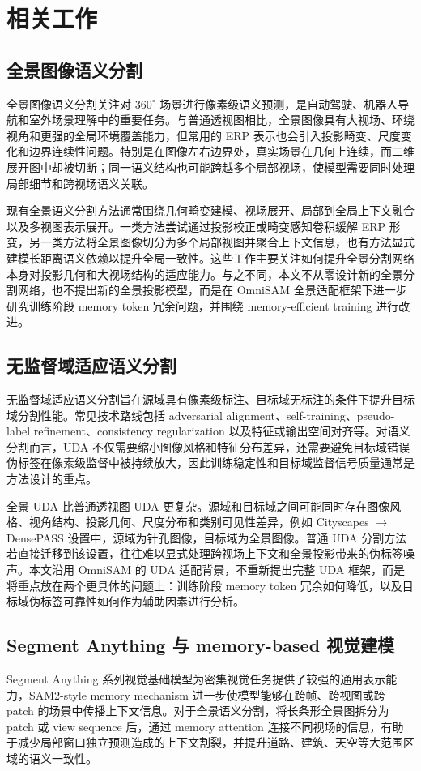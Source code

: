 \section{相关工作}
\label{sec:related_work}

\subsection{全景图像语义分割}
全景图像语义分割关注对 $360^\circ$ 场景进行像素级语义预测，是自动驾驶、机器人导航和室外场景理解中的重要任务。与普通透视图相比，全景图像具有大视场、环绕视角和更强的全局环境覆盖能力，但常用的 ERP 表示也会引入投影畸变、尺度变化和边界连续性问题。特别是在图像左右边界处，真实场景在几何上连续，而二维展开图中却被切断；同一语义结构也可能跨越多个局部视场，使模型需要同时处理局部细节和跨视场语义关联。

现有全景语义分割方法通常围绕几何畸变建模、视场展开、局部到全局上下文融合以及多视图表示展开。一类方法尝试通过投影校正或畸变感知卷积缓解 ERP 形变，另一类方法将全景图像切分为多个局部视图并聚合上下文信息，也有方法显式建模长距离语义依赖以提升全局一致性。这些工作主要关注如何提升全景分割网络本身对投影几何和大视场结构的适应能力。与之不同，本文不从零设计新的全景分割网络，也不提出新的全景投影模型，而是在 OmniSAM 全景适配框架下进一步研究训练阶段 memory token 冗余问题，并围绕 memory-efficient training 进行改进。

\subsection{无监督域适应语义分割}
无监督域适应语义分割旨在源域具有像素级标注、目标域无标注的条件下提升目标域分割性能。常见技术路线包括 adversarial alignment、self-training、pseudo-label refinement、consistency regularization 以及特征或输出空间对齐等。对语义分割而言，UDA 不仅需要缩小图像风格和特征分布差异，还需要避免目标域错误伪标签在像素级监督中被持续放大，因此训练稳定性和目标域监督信号质量通常是方法设计的重点。

全景 UDA 比普通透视图 UDA 更复杂。源域和目标域之间可能同时存在图像风格、视角结构、投影几何、尺度分布和类别可见性差异，例如 Cityscapes $\rightarrow$ DensePASS 设置中，源域为针孔图像，目标域为全景图像。普通 UDA 分割方法若直接迁移到该设置，往往难以显式处理跨视场上下文和全景投影带来的伪标签噪声。本文沿用 OmniSAM 的 UDA 适配背景，不重新提出完整 UDA 框架，而是将重点放在两个更具体的问题上：训练阶段 memory token 冗余如何降低，以及目标域伪标签可靠性如何作为辅助因素进行分析。

\subsection{Segment Anything 与 memory-based 视觉建模}
Segment Anything 系列视觉基础模型为密集视觉任务提供了较强的通用表示能力，SAM2-style memory mechanism 进一步使模型能够在跨帧、跨视图或跨 patch 的场景中传播上下文信息。对于全景语义分割，将长条形全景图拆分为 patch 或 view sequence 后，通过 memory attention 连接不同视场的信息，有助于减少局部窗口独立预测造成的上下文割裂，并提升道路、建筑、天空等大范围区域的语义一致性。

